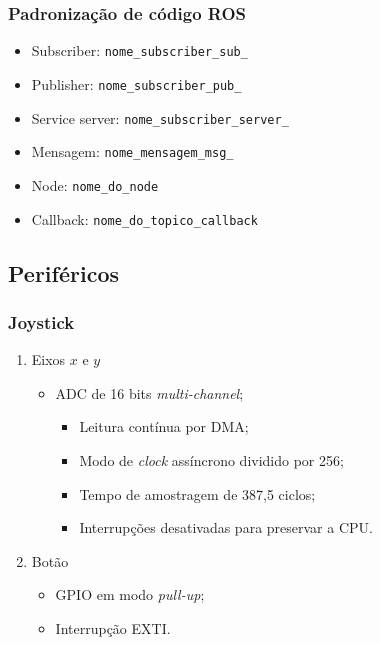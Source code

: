 \subsubsection*{Padronização de código ROS}
	
	\begin{itemize}
		\item Subscriber: \texttt{nome\_subscriber\_sub\_}
		\item Publisher: \texttt{nome\_subscriber\_pub\_}
		\item Service server: \texttt{nome\_subscriber\_server\_}
		\item Mensagem: \texttt{nome\_mensagem\_msg\_}
		\item Node: \texttt{nome\_do\_node}
		\item Callback: \texttt{nome\_do\_topico\_callback}
		
	\end{itemize}

\subsection{Periféricos}

\subsubsection*{Joystick}

\begin{enumerate}
	\item Eixos $x$ e $y$
	\begin{itemize}
		\item ADC de 16 bits \textit{multi-channel};
		\begin{itemize}
			\item Leitura contínua por DMA;
			\item Modo de \textit{clock} assíncrono dividido por 256;
			\item Tempo de amostragem de 387,5 ciclos;
			\item Interrupções desativadas para preservar a CPU.
			
		\end{itemize}				
	\end{itemize}
	
	\item Botão
	\begin{itemize}
		\item GPIO em modo \textit{pull-up};
		\item Interrupção EXTI.
		
	\end{itemize}

\end{enumerate}

